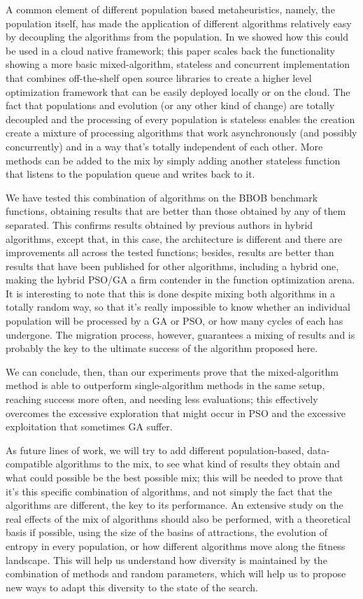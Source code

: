 \documentclass[runningheads]{llncs}
\begin{document}
{A common element of different population based metaheuristics, namely,
the population itself, has made the application of different
algorithms relatively easy by decoupling the algorithms from the
population. In \cite{GARCIAVALDEZ2021234:anon} we showed how this
could be used in a cloud native framework; this paper scales back the
functionality showing a more basic mixed-algorithm, stateless and
concurrent implementation that combines off-the-shelf open source
libraries to create a higher level optimization framework that can be
easily deployed locally or on the cloud. The fact that populations and evolution (or any other kind of
change) are totally decoupled and the processing of every population
is stateless enables the creation create a mixture of processing algorithms that work
asynchronously (and possibly concurrently) and in a way that's totally
independent of each other. More methods can be added to the mix by simply
adding another stateless function that listens to the population queue
and writes back to it.

We have tested this combination of algorithms on the BBOB benchmark
functions, obtaining results that are better than those obtained by
any of them separated. This confirms results obtained by previous
authors in hybrid algorithms, except that, in this case, the
architecture is different and 
there are improvements all across the tested functions; besides,
results are better than results that have been published for other
algorithms, including a hybrid one, making the hybrid PSO/GA a firm
contender in the function optimization arena.
It is interesting to note that this is done despite mixing both
algorithms in a totally random way, so that it's really impossible to
know whether an individual population will be processed by a GA or
PSO, or how many cycles of each has undergone. The migration process,
however, guarantees a mixing of results and is probably the key to the
ultimate success of the algorithm proposed here.

We can conclude, then, than our experiments prove that the mixed-algorithm method is able to
outperform single-algorithm methods in the same setup, reaching
success more often, and needing less evaluations; this effectively
overcomes the excessive exploration that might occur in PSO and the
excessive exploitation that sometimes GA suffer.

As future lines of work, we will try to add different
population-based, data-compatible algorithms to the mix, to see what
kind of results they obtain and what could possible be the best
possible mix; this will be needed to prove that it's this specific
combination of algorithms, and not simply the fact that the algorithms
are different, the key to its performance. An extensive study on the
real effects of the mix of algorithms should also be performed, with a
theoretical basis if possible, using the size of the basins of
attractions, the evolution of entropy in every population, or how
different algorithms move along the fitness landscape. This will help
us understand how diversity is maintained by the combination of
methods and random parameters, which will help us to propose new ways
to adapt this diversity to the state of the search.

}
\end{document}
